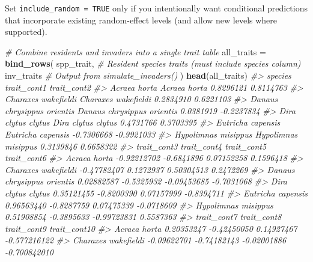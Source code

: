 \documentclass[
]{article}
\newenvironment{Shaded}{\begin{snugshade}}{\end{snugshade}}
\newcommand{\CommentTok}[1]{\textcolor[rgb]{0.56,0.35,0.01}{\textit{#1}}}
\newcommand{\FunctionTok}[1]{\textcolor[rgb]{0.13,0.29,0.53}{\textbf{#1}}}
\newcommand{\NormalTok}[1]{#1}
\newcommand{\OtherTok}[1]{\textcolor[rgb]{0.56,0.35,0.01}{#1}}
\begin{document}
Set \texttt{include\_random\ =\ TRUE} only if you intentionally want
conditional predictions that incorporate existing random-effect levels
(and allow new levels where supported).

\begin{Shaded}
\begin{Highlighting}[]
\CommentTok{\# Combine residents and invaders into a single trait table}
\NormalTok{all\_traits }\OtherTok{=} \FunctionTok{bind\_rows}\NormalTok{(}
\NormalTok{  spp\_trait,      }\CommentTok{\# Resident species traits (must include \textquotesingle{}species\textquotesingle{} column)}
\NormalTok{  inv\_traits      }\CommentTok{\# Output from simulate\_invaders()}
\NormalTok{) }
\FunctionTok{head}\NormalTok{(all\_traits)}
\CommentTok{\#\textgreater{}                                               species trait\_cont1 trait\_cont2}
\CommentTok{\#\textgreater{} Acraea horta                             Acraea horta   0.8296121   0.8114763}
\CommentTok{\#\textgreater{} Charaxes wakefieldi               Charaxes wakefieldi   0.2834910   0.6221103}
\CommentTok{\#\textgreater{} Danaus chrysippus orientis Danaus chrysippus orientis   0.0381919  {-}0.2237834}
\CommentTok{\#\textgreater{} Dira clytus clytus                 Dira clytus clytus   0.4731766   0.3703395}
\CommentTok{\#\textgreater{} Eutricha capensis                   Eutricha capensis  {-}0.7306668  {-}0.9921033}
\CommentTok{\#\textgreater{} Hypolimnas misippus               Hypolimnas misippus   0.3139846   0.6658322}
\CommentTok{\#\textgreater{}                            trait\_cont3 trait\_cont4 trait\_cont5 trait\_cont6}
\CommentTok{\#\textgreater{} Acraea horta               {-}0.92212702  {-}0.6841896  0.07152258   0.1596418}
\CommentTok{\#\textgreater{} Charaxes wakefieldi        {-}0.47782407   0.1272937  0.50304513   0.2472269}
\CommentTok{\#\textgreater{} Danaus chrysippus orientis  0.02882587  {-}0.5325932 {-}0.09453685  {-}0.7031068}
\CommentTok{\#\textgreater{} Dira clytus clytus          0.35121455  {-}0.8200390  0.07157999  {-}0.8394711}
\CommentTok{\#\textgreater{} Eutricha capensis           0.96563440  {-}0.8287759  0.07475339  {-}0.0718609}
\CommentTok{\#\textgreater{} Hypolimnas misippus         0.51908854  {-}0.3895633 {-}0.99723831   0.5587363}
\CommentTok{\#\textgreater{}                            trait\_cont7 trait\_cont8 trait\_cont9 trait\_cont10}
\CommentTok{\#\textgreater{} Acraea horta                0.20353247 {-}0.42450050  0.14927467 {-}0.577216122}
\CommentTok{\#\textgreater{} Charaxes wakefieldi        {-}0.09622701 {-}0.74182143 {-}0.02001886 {-}0.700842010}

\end{Highlighting}
\end{Shaded}
\end{document}
